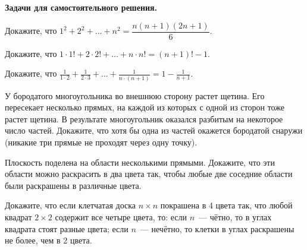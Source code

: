 

{\bf Задачи для самостоятельного решения.}


\begin{problems}
\item
Докажите, что $1^2 + 2^2 + \ldots + n^2 = \dfrac{n(n+1)(2n+1)}{6}.$


\item
Докажите, что $1 \cdot 1! + 2 \cdot 2! + \ldots + n \cdot n! = (n+1)! - 1.$


\item
Докажите, что $\frac{1}{1 \cdot 2} + \frac{1}{2 \cdot 3} + \ldots + \frac{1}{n \cdot (n+1)} = 1 - \frac{1}{n+1}.$




\item
У бородатого многоугольника во внешнюю сторону растет щетина. Его
пересекает несколько прямых, на каждой из которых с одной из сторон
тоже растет щетина. В результате многоугольник оказался разбитым на
некоторое число частей. Докажите, что хотя бы одна из частей
окажется бородатой снаружи (никакие три прямые не проходят через
одну точку).

\item
Плоскость поделена на области несколькими прямыми. Докажите, что эти
области можно раскрасить в два цвета так, чтобы любые две соседние
области были раскрашены в различные цвета.






\item
Докажите, что если клетчатая доска $n \times n$ покрашена в 4 цвета
так, что любой квадрат $2 \times 2$ содержит все четыре цвета, то:
если $n$~--- чётно, то в углах квадрата стоят разные цвета; если $n$~---
нечётно, то клетки в углах раскрашены не более, чем в 2 цвета.


\end{problems}
